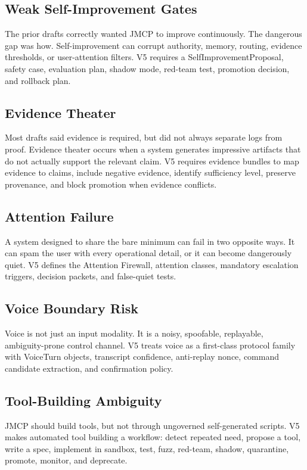 \documentclass[12pt,journal,onecolumn,draftclsnofoot]{IEEEtran}
\begin{document}
\subsection{Weak Self-Improvement Gates}
The prior drafts correctly wanted JMCP to improve continuously. The dangerous gap was how. Self-improvement can corrupt authority, memory, routing, evidence thresholds, or user-attention filters. V5 requires a SelfImprovementProposal, safety case, evaluation plan, shadow mode, red-team test, promotion decision, and rollback plan.

\subsection{Evidence Theater}
Most drafts said evidence is required, but did not always separate logs from proof. Evidence theater occurs when a system generates impressive artifacts that do not actually support the relevant claim. V5 requires evidence bundles to map evidence to claims, include negative evidence, identify sufficiency level, preserve provenance, and block promotion when evidence conflicts.

\subsection{Attention Failure}
A system designed to share the bare minimum can fail in two opposite ways. It can spam the user with every operational detail, or it can become dangerously quiet. V5 defines the Attention Firewall, attention classes, mandatory escalation triggers, decision packets, and false-quiet tests.

\subsection{Voice Boundary Risk}
Voice is not just an input modality. It is a noisy, spoofable, replayable, ambiguity-prone control channel. V5 treats voice as a first-class protocol family with VoiceTurn objects, transcript confidence, anti-replay nonce, command candidate extraction, and confirmation policy.

\subsection{Tool-Building Ambiguity}
JMCP should build tools, but not through ungoverned self-generated scripts. V5 makes automated tool building a workflow: detect repeated need, propose a tool, write a spec, implement in sandbox, test, fuzz, red-team, shadow, quarantine, promote, monitor, and deprecate.
\end{document}
